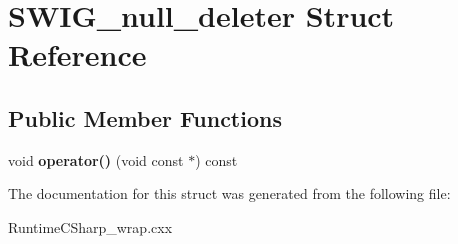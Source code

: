 \hypertarget{struct_s_w_i_g__null__deleter}{}\section{S\+W\+I\+G\+\_\+null\+\_\+deleter Struct Reference}
\label{struct_s_w_i_g__null__deleter}
\subsection*{Public Member Functions}
\begin{DoxyCompactItemize}
\item 
void {\bfseries operator()} (void const $\ast$) const \hypertarget{struct_s_w_i_g__null__deleter_aa95dacef916da5f0a455c37edaf8aefc}{}\label{struct_s_w_i_g__null__deleter_aa95dacef916da5f0a455c37edaf8aefc}

\end{DoxyCompactItemize}


The documentation for this struct was generated from the following file\+:\begin{DoxyCompactItemize}
\item 
Runtime\+C\+Sharp\+\_\+wrap.\+cxx\end{DoxyCompactItemize}
